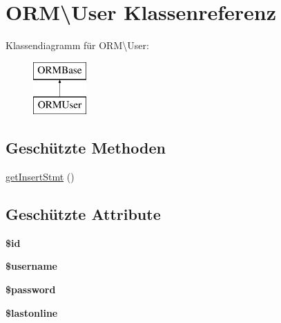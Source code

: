 \hypertarget{class_o_r_m_1_1_user}{\section{O\-R\-M\textbackslash{}User Klassenreferenz}
\label{class_o_r_m_1_1_user}
}
Klassendiagramm für O\-R\-M\textbackslash{}User\-:\begin{figure}[H]
\begin{center}
\leavevmode
\includegraphics[height=2.000000cm]{class_o_r_m_1_1_user}
\end{center}
\end{figure}
\subsection*{Geschützte Methoden}
\begin{DoxyCompactItemize}
\item 
\hyperlink{class_o_r_m_1_1_user_a1946784416c90347ef61d1db5a8c372c}{get\-Insert\-Stmt} ()
\end{DoxyCompactItemize}
\subsection*{Geschützte Attribute}
\begin{DoxyCompactItemize}
\item 
\hypertarget{class_o_r_m_1_1_user_ae5d9a1009fb321dc13113a593a01a84e}{{\bfseries \$id}}\label{class_o_r_m_1_1_user_ae5d9a1009fb321dc13113a593a01a84e}

\item 
\hypertarget{class_o_r_m_1_1_user_a5bad4ffadb0f19db26c30a9fa1150f01}{{\bfseries \$username}}\label{class_o_r_m_1_1_user_a5bad4ffadb0f19db26c30a9fa1150f01}

\item 
\hypertarget{class_o_r_m_1_1_user_a3bc7b5558b8e03928b4d3f388c7a38d4}{{\bfseries \$password}}\label{class_o_r_m_1_1_user_a3bc7b5558b8e03928b4d3f388c7a38d4}

\item 
\hypertarget{class_o_r_m_1_1_user_afc99ea5cedcf61f33468968b2c10902d}{{\bfseries \$lastonline}}\label{class_o_r_m_1_1_user_afc99ea5cedcf61f33468968b2c10902d}

\end{DoxyCompactItemize}
